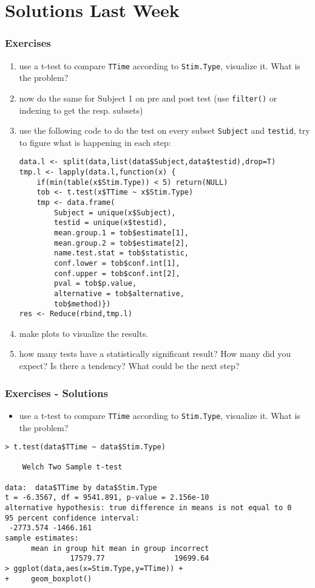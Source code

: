 \section{Solutions Last Week}
\begin{frame}\frametitle{Exercises} 
  \begin{enumerate}
  \item use a t-test to compare \texttt{TTime} according to \texttt{Stim.Type}, visualize it. What is the problem?
  \item now do the same for Subject 1 on pre and post test (use \texttt{filter()} or indexing to get the resp. subsets)
  \item use the following code to do the test on every subset \texttt{Subject} and \texttt{testid}, try to figure what is happening in each step:\tiny
\begin{verbatim}
data.l <- split(data,list(data$Subject,data$testid),drop=T)
tmp.l <- lapply(data.l,function(x) {
    if(min(table(x$Stim.Type)) < 5) return(NULL)
    tob <- t.test(x$TTime ~ x$Stim.Type)
    tmp <- data.frame(
        Subject = unique(x$Subject),
        testid = unique(x$testid),
        mean.group.1 = tob$estimate[1],
        mean.group.2 = tob$estimate[2],
        name.test.stat = tob$statistic,
        conf.lower = tob$conf.int[1],
        conf.upper = tob$conf.int[2],
        pval = tob$p.value,
        alternative = tob$alternative,
        tob$method)})
res <- Reduce(rbind,tmp.l)
\end{verbatim}\normalsize
  \item make plots to visualize the results. 
  \item how many tests have a statistically significant result? How many did you expect? Is there a tendency? What could be the next step?
  \end{enumerate}
\end{frame}

\begin{frame}[fragile]\frametitle{Exercises - Solutions}
  \begin{itemize}
  \item use a t-test to compare \texttt{TTime} according to \texttt{Stim.Type}, visualize it. What is the problem?
  \end{itemize}\footnotesize
\begin{verbatim}
> t.test(data$TTime ~ data$Stim.Type)

	Welch Two Sample t-test

data:  data$TTime by data$Stim.Type
t = -6.3567, df = 9541.891, p-value = 2.156e-10
alternative hypothesis: true difference in means is not equal to 0
95 percent confidence interval:
 -2773.574 -1466.161
sample estimates:
      mean in group hit mean in group incorrect 
               17579.77                19699.64   
> ggplot(data,aes(x=Stim.Type,y=TTime)) +
+     geom_boxplot()
\end{verbatim}
\end{frame}


